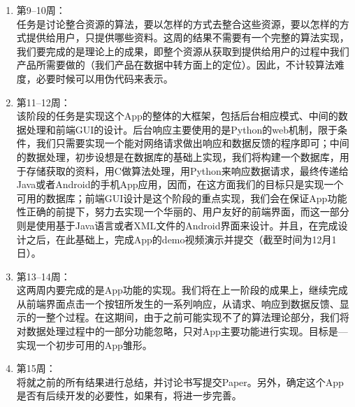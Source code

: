 \documentclass[12pt,a4paper]{article}
\begin{document}
\begin{CJK}{UTF8}{gbsn}
\begin{description}
\begin{enumerate}
	\item 第9--10周：\\
	任务是讨论整合资源的算法，要以怎样的方式去整合这些资源，要以怎样的方式提供给用户，只提供哪些资料。这周的结果不需要有一个完整的算法实现，我们要完成的是理论上的成果，即整个资源从获取到提供给用户的过程中我们产品所需要做的（我们产品在数据中转方面上的定位）。因此，不计较算法难度，必要时候可以用伪代码来表示。\\
	\item 第11--12周：\\
	该阶段的任务是实现这个App的整体的大框架，包括后台相应模式、中间的数据处理和前端GUI的设计。后台响应主要使用的是Python的web机制，限于条件，我们只需要实现一个能对网络请求做出响应和数据反馈的程序即可；中间的数据处理，初步设想是在数据库的基础上实现，我们将构建一个数据库，用于存储获取的资料，用C做算法处理，用Python来响应数据请求，最终传递给Java或者Android的手机App应用，因而，在这方面我们的目标只是实现一个可用的数据库；前端GUI设计是这个阶段的重点实现，我们会在保证App功能性正确的前提下，努力去实现一个华丽的、用户友好的前端界面，而这一部分则是使用基于Java语言或者XML文件的Android界面来设计。并且，在完成设计之后，在此基础上，完成App的demo视频演示并提交（截至时间为12月1日）。\\
	\item 第13--14周：\\
	这两周内要完成的是App功能的实现。我们将在上一阶段的成果上，继续完成从前端界面点击一个按钮所发生的一系列响应，从请求、响应到数据反馈、显示的一整个过程。在这期间，由于之前可能实现不了的算法理论部分，我们将对数据处理过程中的一部分功能忽略，只对App主要功能进行实现。目标是---实现一个初步可用的App雏形。\\
	\item 第15周：\\
	将就之前的所有结果进行总结，并讨论书写提交Paper。另外，确定这个App是否有后续开发的必要性，如果有，将进一步完善。\\
	\end{enumerate}
	\end{description}


\end{CJK}
\end{document}
